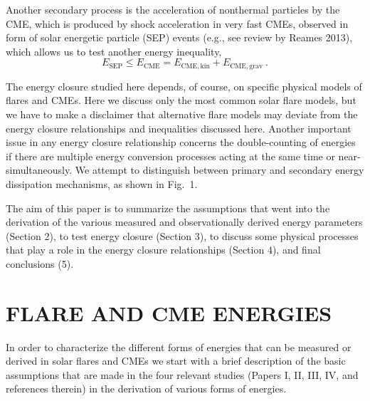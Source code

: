 \documentclass[10pt,preprint]{aastex}  %
\begin{document}
Another secondary process is the acceleration of nonthermal particles
by the CME, which is produced by shock acceleration in very fast 
CMEs, observed in form of solar energetic particle (SEP)
events (e.g., see review by Reames 2013), 
which allows us to test another energy inequality,
\begin{equation}
	E_{\mathrm{SEP}} \le E_{\mathrm{CME}} = 
	E_{\mathrm{CME,kin}} + E_{\mathrm{CME,grav}} \ .
\end{equation}

The energy closure studied here depends, of course, on specific
physical models of flares and CMEs. Here we discuss only the most
common solar flare models, but we have to make a disclaimer that
alternative flare models may deviate from the energy closure
relationships and inequalities discussed here. Another important
issue in any energy closure relationship concerns the double-counting
of energies if there are multiple energy conversion processes acting
at the same time or near-simultaneously. We attempt to distinguish
between primary and secondary energy dissipation mechanisms,
as shown in Fig.~1. 

The aim of this paper is to summarize the assumptions that went
into the derivation of the various measured and observationally
derived energy parameters (Section 2), to test energy closure
(Section 3), to discuss some physical processes that play a role 
in the energy closure relationships (Section 4), and final 
conclusions (5).

\section{		FLARE AND CME ENERGIES 			}

In order to characterize the different forms of energies that can
be measured or derived in solar flares and CMEs we start with a
brief description of the basic assumptions that are made in the
four relevant studies (Papers I, II, III, IV, and references
therein) in the derivation of various forms of energies. 
\end{document}

